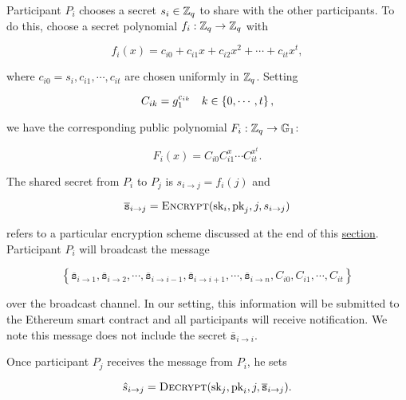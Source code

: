 Participant $P_{i}$ chooses a secret
$s_{i}\in\mathbb{Z}_{q}$ to share with the other participants.
To do this, choose a secret polynomial $f_{i}:\mathbb{Z}_{q}\to\mathbb{Z}_{q}$
with

\begin{equation}
    f_{i}(x) = c_{i0} + c_{i1}x + c_{i2}x^{2} + \cdots + c_{it}x^{t},
\end{equation}

\noindent
where $c_{i0} = s_{i}, c_{i1}, \cdots, c_{it}$ are chosen uniformly
in $\mathbb{Z}_{q}$.
Setting

\begin{equation}
    C_{ik} = g_{1}^{c_{ik}}\quad k\in\left\{ 0,\cdots,t \right\},
\end{equation}

\noindent
we have the corresponding public polynomial $F_{i}:\mathbb{Z}_{q}\to\mathbb{G}_{1}$:

\begin{equation}
    F_{i}(x) = C_{i0}C_{i1}^{x}\cdots C_{it}^{x^{t}}.
\end{equation}

\noindent
The shared secret from $P_{i}$ to $P_{j}$ is $s_{i\to j} = f_{i}(j)$
and

\begin{equation}
    \overline{\texttt{s}}_{i\to j} =
        \textsc{Encrypt}(\text{sk}_{i},\text{pk}_{j},j, s_{i\to j})
\end{equation}

\noindent
refers to a particular encryption scheme discussed
at the end of this \hyperref[par:secret_enc]{section}.
Participant $P_{i}$ will broadcast the message

\begin{equation}
    \left\{ 
        \overline{\texttt{s}}_{i\to 1}, \overline{\texttt{s}}_{i\to 2},
            \cdots,
            \overline{\texttt{s}}_{i\to i-1},
            \overline{\texttt{s}}_{i\to i+1},
            \cdots,
            \overline{\texttt{s}}_{i\to n},
        C_{i0}, C_{i1}, \cdots, C_{it}
    \right\}
\end{equation}

\noindent
over the broadcast channel.
In our setting, this information will be submitted to the
Ethereum smart contract and
all participants will receive notification.
We note this message does not include the secret
$\overline{\texttt{s}}_{i\to i}$.

Once participant $P_{j}$ receives the message from $P_{i}$,
he sets

\begin{equation}
    \hat{s}_{i\to j} = \textsc{Decrypt}(\text{sk}_{j},\text{pk}_{i}, j,
        \overline{\texttt{s}}_{i\to j}).
\end{equation}


